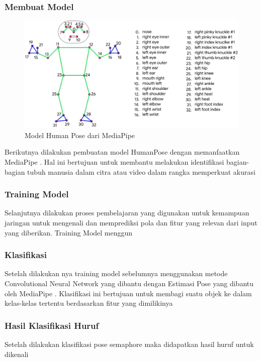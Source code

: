 \subsubsection{Membuat Model}
\begin{figure} [ht] \centering
  \includegraphics[scale=0.7]{gambar/humanpose.jpg}
  \caption{Model Human Pose dari MediaPipe}
  \label{fig:Blueprint}
\end{figure}
Berikutnya dilakukan pembuatan model HumanPose dengan memanfaatkan MediaPipe . Hal ini bertujuan untuk membantu melakukan identifikasi bagian-bagian tubuh manusia dalam citra atau video dalam rangka memperkuat akurasi 

\subsubsection{Training Model}
Selanjutnya dilakukan proses pembelajaran yang digunakan untuk  kemampuan jaringan untuk mengenali dan memprediksi pola dan fitur yang relevan dari input yang diberikan. Training Model menggun

\subsubsection{Klasifikasi}
Setelah dilakukan nya training model sebelumnya menggunakan metode Convolutional Neural Network yang dibantu dengan Estimasi Pose yang dibantu oleh MediaPipe . Klasifikasi ini bertujuan untuk membagi suatu objek ke dalam kelas-kelas tertentu berdasarkan fitur yang dimilikinya

\subsubsection{Hasil Klasifikasi Huruf}
Setelah dilakukan klasifikasi pose semaphore maka didapatkan hasil huruf untuk dikenali

